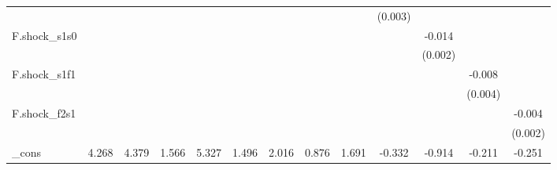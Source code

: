 {\begin{tabular}{l*{12}{c}}
            &                     &                     &                     &                     &                     &                     &                     &                     &     (0.003)         &                     &                     &                     \\
\addlinespace
F.shock\_s1s0&                     &                     &                     &                     &                     &                     &                     &                     &                     &      -0.014\sym{***}&                     &                     \\
            &                     &                     &                     &                     &                     &                     &                     &                     &                     &     (0.002)         &                     &                     \\
\addlinespace
F.shock\_s1f1&                     &                     &                     &                     &                     &                     &                     &                     &                     &                     &      -0.008\sym{*}  &                     \\
            &                     &                     &                     &                     &                     &                     &                     &                     &                     &                     &     (0.004)         &                     \\
\addlinespace
F.shock\_f2s1&                     &                     &                     &                     &                     &                     &                     &                     &                     &                     &                     &      -0.004\sym{**} \\
            &                     &                     &                     &                     &                     &                     &                     &                     &                     &                     &                     &     (0.002)         \\
\addlinespace
\_cons      &       4.268\sym{***}&       4.379\sym{***}&       1.566\sym{***}&       5.327\sym{***}&       1.496\sym{**} &       2.016\sym{***}&       0.876\sym{**} &       1.691\sym{***}&      -0.332         &      -0.914\sym{**} &      -0.211         &      -0.251\sym{*}  \\

\end{tabular}}
